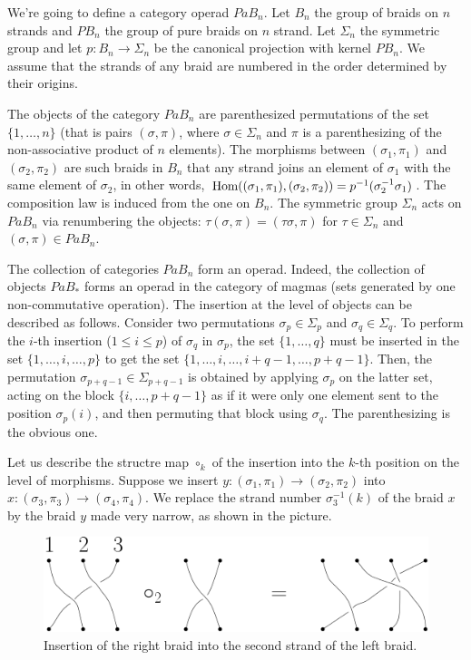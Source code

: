 \documentclass[TFM.tex]{subfiles}
\begin{document}
We're going to define a category operad $PaB_n$. Let $B_n$ the group of braids on $n$ strands and $PB_n$ the group of pure braids on $n$ strand. Let $\Sigma_n$ the symmetric group and let $p:B_n\to \Sigma_n$ be the canonical projection with kernel $PB_n$. We assume that the strands of any braid are numbered in the order determined by their origins. 

The objects of the category $PaB_n$ are parenthesized permutations of the set $\{1,\dots, n\}$ (that is pairs $(\sigma,\pi)$, where $\sigma\in\Sigma_n$ and $\pi$ is a parenthesizing of the non-associative product of $n$ elements). The morphisms between $(\sigma_1,\pi_1)$ and $(\sigma_2,\pi_2)$ are such braids in $B_n$ that any strand joins an element of $\sigma_1$ with the same element of $\sigma_2$, in other words, $\operatorname{Hom}((\sigma_1,\pi_1),(\sigma_2,\pi_2))=p^{-1}(\sigma_2^{-1}\sigma_1)$. The composition law is induced from the one on $B_n$. The symmetric group $\Sigma_n$ acts on $PaB_n$ via renumbering the objects: $\tau(\sigma,\pi)=(\tau\sigma,\pi)$ for $\tau\in\Sigma_n$ and $(\sigma,\pi)\in PaB_n$. 


The collection of categories $PaB_n$ form an operad. Indeed, the collection of objects $PaB_*$ forms an operad in the category of magmas (sets generated by one non-commutative operation). The insertion at the level of objects can be described as follows. Consider two permutations $\sigma_p\in\Sigma_p$ and $\sigma_q\in\Sigma_q$. To perform the $i$-th insertion ($1\leq i\leq p$) of $\sigma_q$ in $\sigma_p$, the set $\{1,\dots, q\}$ must be inserted in the set $\{1,\dots, i,\dots, p\}$ to get the set $\{1,\dots, i,\dots,i+q-1,\dots, p+q-1\}$. Then, the permutation $\sigma_{p+q-1}\in\Sigma_{p+q-1}$ is obtained by applying $\sigma_p$ on the latter set, acting on the block $\{i,\dots, p+q-1\}$ as if it were only one element sent to the position $\sigma_p(i)$, and then permuting that block using $\sigma_q$. The parenthesizing is the obvious one. 

Let us describe the structre map $\circ_k$ of the insertion into the $k$-th position on the level of morphisms. Suppose we insert $y:(\sigma_1,\pi_1)\to (\sigma_2,\pi_2)$ into $x:(\sigma_3,\pi_3)\to(\sigma_4,\pi_4)$. We replace the strand number $\sigma^{-1}_3(k)$ of the braid $x$ by the braid $y$ made very narrow, as shown in the picture.

\begin{figure}[h!]
\includegraphics[scale=0.7]{Imagenes/insercion.png}
\caption{Insertion of the right braid into the second strand of the left braid.}
\end{figure}
\end{document}
